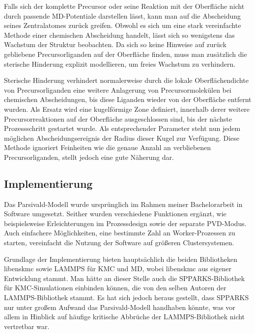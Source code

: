 Falls sich der komplette Precursor oder seine Reaktion mit der Oberfläche nicht durch passende MD-Potentiale darstellen lässt, kann man auf die Abscheidung seines Zentralatomes zurück greifen.
Obwohl es sich um eine stark vereinfachte Methode einer chemischen Abscheidung handelt, lässt sich so wenigstens das Wachstum der Struktur beobachten.
Da sich so keine Hinweise auf zurück gebliebene Precursorliganden auf der Oberfläche finden, muss man zusätzlich die sterische Hinderung explizit modellieren, um freies Wachstum zu verhindern.


Sterische Hinderung verhindert normalerweise durch die lokale Oberflächendichte von Precursorliganden eine weitere Anlagerung von Precursormolekülen bei chemischen Abscheidungen, bis diese Liganden wieder von der Oberfläche entfernt wurden.
Als Ersatz wird eine kugelförmige Zone definiert, innerhalb derer weitere Precursorreaktionen auf der Oberfläche ausgeschlossen sind, bis der nächste Prozessschritt gestartet wurde.
Als entsprechender Parameter steht nun jedem möglichen Abscheidungsereignis der Radius dieser Kugel zur Verfügung.
Diese Methode ignoriert Feinheiten wie die genaue Anzahl an verbliebenen Precursorliganden, stellt jedoch eine gute Näherung dar.

\subsection{Implementierung}

Das Parsivald-Modell wurde ursprünglich im Rahmen meiner Bachelorarbeit  in Software umgesetzt.
Seither wurden verschiedene Funktionen ergänzt, wie beispielsweise Erleichterungen im Prozessdesign sowie der separate PVD-Modus.
Auch einfachere Möglichkeiten, eine bestimmte Zahl an Worker-Prozessen zu starten, vereinfacht die Nutzung der Software auf größeren Clustersystemen.

Grundlage der Implementierung bieten hauptsächlich die beiden Bibliotheken libenskmc sowie LAMMPS für KMC und MD, wobei libenskmc aus eigener Entwicklung stammt.
Man hätte an dieser Stelle auch die SPPARKS-Bibliothek für KMC-Simulationen einbinden können, die von den selben Autoren der LAMMPS-Bibliothek stammt.
Es hat sich jedoch heraus gestellt, dass SPPARKS nur unter großem Aufwand das Parsivald-Modell handhaben könnte, was vor allem in Hinblick auf häufige kritische Abbrüche der LAMMPS-Bibliothek nicht vertretbar war.

